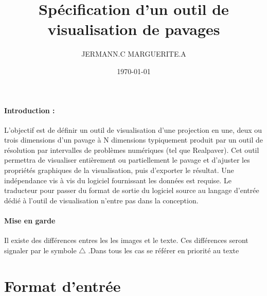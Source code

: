 \documentclass[a4paper]{article}
\title{\textbf{Spécification d'un outil de visualisation de pavages}}
\author{ JERMANN.C MARGUERITE.A}
\date{\today}
\begin{document}
\maketitle{}
\renewcommand\labelitemi{\textbullet}

\paragraph{Introduction :} L'objectif est de définir un outil de visualisation d'une projection en une, deux ou trois dimensions d'un pavage à N dimensions typiquement produit par un outil de résolution par intervalles de problèmes numériques (tel que Realpaver). Cet outil permettra de visualiser entièrement ou partiellement le pavage et d'ajuster les propriétés graphiques de la visualisation, puis d'exporter le résultat. Une indépendance vis à vis du logiciel fournissant les données est requise. Le traducteur pour passer du format de sortie du logiciel source au langage d'entrée dédié à l'outil de visualisation n'entre pas dans la conception.
\paragraph{Mise en garde}
Il existe des différences entres les les images et le texte. Ces différences seront signaler par le symbole $\triangle$ .Dans tous les cas se référer en priorité au texte
\section{Format d'entrée}

\end{document}

